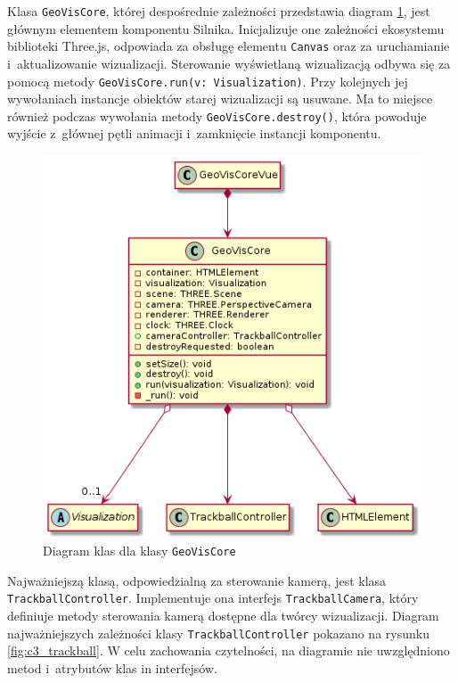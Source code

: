 Klasa \texttt{GeoVisCore}, której despośrednie zależności przedstawia diagram \ref{fig:c3_geo_vis_core}, jest głównym elementem komponentu Silnika. Inicjalizuje one zależności ekosystemu biblioteki Three.js, odpowiada za obsługę elementu \texttt{Canvas} oraz za uruchamianie i~aktualizowanie wizualizacji. Sterowanie wyświetlaną wizualizacją odbywa się za pomocą metody \mbox{\texttt{GeoVisCore.run(v: Visualization)}}. Przy kolejnych jej wywołaniach instancje obiektów starej wizualizacji są usuwane. Ma to miejsce również podczas wywołania metody \mbox{\texttt{GeoVisCore.destroy()}}, która powoduje wyjście z~głównej pętli animacji i~zamknięcie instancji komponentu.

\begin{figure}
    \centering
    \includegraphics[scale=0.6]{diagrams/out/c3_geo_vis_core.png}
    \caption{Diagram klas dla klasy \texttt{GeoVisCore}}
    \label{fig:c3_geo_vis_core}
\end{figure}

Najważniejszą klasą, odpowiedzialną za sterowanie kamerą, jest klasa \texttt{TrackballController}. Implementuje ona interfejs \texttt{TrackballCamera}, który definiuje metody sterowania kamerą dostępne dla twórcy wizualizacji. Diagram najważniejszych zależności klasy \texttt{TrackballController} pokazano na rysunku \ref{fig:c3_trackball}. W celu zachowania czytelności, na diagramie nie uwzględniono metod i~atrybutów klas in interfejsów.

